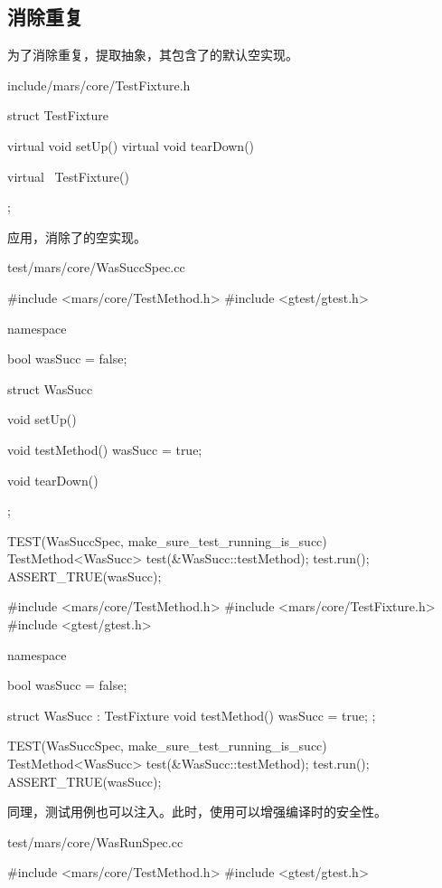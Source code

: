 \begin{content}
\subsection{消除重复}

为了消除重复，提取抽象，其包含了的默认空实现。

\begin{nodiff}{include/mars/core/TestFixture.h}
\begin{c++}
struct TestFixture {
  virtual void setUp() {}
  virtual void tearDown() {}
  
  virtual ~TestFixture() {}
};
\end{c++}
\end{nodiff}

应用，消除了的空实现。

\begin{diff}{test/mars/core/WasSuccSpec.cc}
\begin{minicpp}
#include <mars/core/TestMethod.h>
#include <gtest/gtest.h>

namespace {
  bool wasSucc = false;

  struct WasSucc {
    void setUp() {
    }

    void testMethod() {
      wasSucc = true;
    }

    void tearDown() {
    }
  };
}

TEST(WasSuccSpec, make_sure_test_running_is_succ) {
  TestMethod<WasSucc> test(&WasSucc::testMethod);
  test.run();
  ASSERT_TRUE(wasSucc);
}
\end{minicpp}
\tcblower
\begin{minicpp}
#include <mars/core/TestMethod.h>
#include <mars/core/TestFixture.h>
#include <gtest/gtest.h>

namespace {
  bool wasSucc = false;

  struct WasSucc : TestFixture {
    void testMethod() {
      wasSucc = true;
    }
  };
}

TEST(WasSuccSpec, make_sure_test_running_is_succ) {
  TestMethod<WasSucc> test(&WasSucc::testMethod);
  test.run();
  ASSERT_TRUE(wasSucc);
}
\end{minicpp}
\end{diff}

同理，测试用例也可以注入。此时，使用可以增强编译时的安全性。

\begin{diff}{test/mars/core/WasRunSpec.cc}
\begin{minicpp}
#include <mars/core/TestMethod.h>
#include <gtest/gtest.h>


\end{minicpp}
\end{diff}
\end{content}
